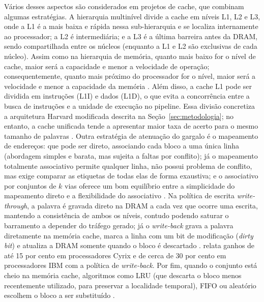 \documentclass[portuguese]{sbcreviews-2025}%
\begin{document}
Vários desses aspectos são considerados em projetos de cache, que combinam algumas estratégias. A hierarquia multinível divide a cache em níveis L1, L2 e L3, onde a L1 é a mais baixa e rápida nessa sub-hierarquia e se localiza internamente 
ao processador; a L2 é intermediária; e a L3 é a última barreira antes da DRAM, sendo compartilhada entre os núcleos (enquanto a L1 e L2 são exclusivas de cada núcleo). Assim como na hierarquia de memória, quanto mais baixo for o nível de cache, maior será a capacidade 
e menor a velocidade de operação; consequentemente, quanto mais próximo do processador for o nível, maior será a velocidade e menor a capacidade da memória \citep{stallings2010, ferreira2015}. Além disso, a cache L1 pode ser dividida em instruções (L1I) e dados (L1D), 
o que evita a concorrência entre a busca de instruções e a unidade de execução no pipeline. Essa divisão concretiza a arquitetura Harvard modificada descrita na Seção~\ref{sec:metodologia}; no entanto, a cache unificada tende a apresentar maior taxa de acerto para o mesmo 
tamanho de palavras \citep{stallings2010}. Outra estratégia de atenuação do gargalo é o mapeamento de endereços: que pode ser direto, associando cada bloco a uma única linha (abordagem simples e barata, mas sujeita a faltas por conflito); já o mapeamento totalmente associativo 
permite qualquer linha, não possui problema de conflito, mas exige comparar as etiquetas de todas elas de forma exaustiva; e o associativo por conjuntos de $k$ vias oferece um bom equilíbrio entre a simplicidade do mapeamento direto e a flexibilidade do associativo \citep{stallings2010}. 
Na política de escrita \textit{write-through}, a palavra é gravada direto na DRAM a cada vez que ocorre uma escrita, mantendo a consistência de ambos os níveis, contudo podendo saturar o barramento a depender do tráfego gerado; já o \textit{write-back} grava a palavra diretamente na memória 
cache, marca a linha com um bit de modificação (\textit{dirty bit}) e atualiza a DRAM somente quando o bloco é descartado \citep{stallings2010}. \citep{ferreira2015} relata ganhos de até 15 por cento em processadores Cyrix e de cerca de 30 por cento em processadores IBM com a política de 
\textit{write-back}. Por fim, quando o conjunto está cheio na memória cache, algoritmos como LRU (que descarta o bloco menos recentemente utilizado, para preservar a localidade temporal), FIFO ou aleatório escolhem o bloco a ser substituído \citep{stallings2010}.
\end{document}
